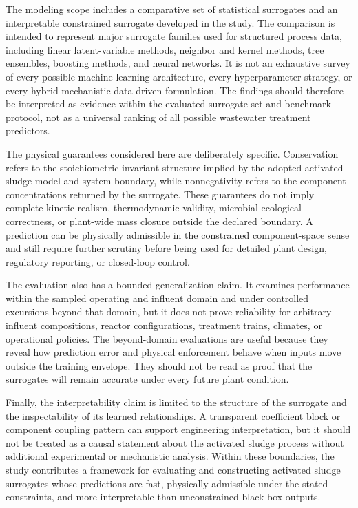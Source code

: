 \documentclass[12pt, twoside]{book}
\begin{document}
The modeling scope includes a comparative set of statistical surrogates and an interpretable constrained
surrogate developed in the study. The comparison is intended to represent major surrogate families
used for structured process data, including linear latent-variable methods, neighbor and kernel methods, tree
ensembles, boosting methods, and neural networks. It is not an exhaustive survey of every possible machine
learning architecture, every hyperparameter strategy, or every hybrid mechanistic data driven formulation. The
findings should therefore be interpreted as evidence within the evaluated surrogate set and benchmark protocol,
not as a universal ranking of all possible wastewater treatment predictors.

The physical guarantees considered here are deliberately specific. Conservation refers to the
stoichiometric invariant structure implied by the adopted activated sludge model and system boundary, while
nonnegativity refers to the component concentrations returned by the surrogate. These guarantees do not imply
complete kinetic realism, thermodynamic validity, microbial ecological correctness, or plant-wide mass closure
outside the declared boundary. A prediction can be physically admissible in the constrained component-space
sense and still require further scrutiny before being used for detailed plant design, regulatory reporting, or
closed-loop control.

The evaluation also has a bounded generalization claim. It examines performance within the
sampled operating and influent domain and under controlled excursions beyond that domain, but it does not prove
reliability for arbitrary influent compositions, reactor configurations, treatment trains, climates, or
operational policies. The beyond-domain evaluations are useful because they reveal how prediction error and
physical enforcement behave when inputs move outside the training envelope. They should not be read as proof
that the surrogates will remain accurate under every future plant condition.

Finally, the interpretability claim is limited to the structure of the surrogate and the inspectability of its
learned relationships. A transparent coefficient block or component coupling pattern can support engineering
interpretation, but it should not be treated as a causal statement about the activated sludge process without
additional experimental or mechanistic analysis. Within these boundaries, the study contributes a framework
for evaluating and constructing activated sludge surrogates whose predictions are fast, physically
admissible under the stated constraints, and more interpretable than unconstrained black-box outputs.
\end{document}
